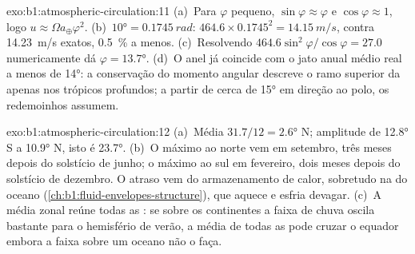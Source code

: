 \begin{solution}{exo:b1:atmospheric-circulation:11}
(a)~Para $\varphi$ pequeno, $\sin\varphi \approx \varphi$ e $\cos\varphi \approx 1$,
logo $u \approx \Omega a_\oplus\varphi^2$. (b)~$\ang{10} = \qty{0.1745}{rad}$:
$464.6 \times 0.1745^2 = \qty{14.15}{m/s}$, contra \qty{14.23}{m/s} exatos,
\qty{0.5}{\percent} a menos. (c)~Resolvendo $464.6\sin^2\varphi/\cos\varphi = 27.0$
numericamente dá $\varphi = \ang{13.7}$. (d)~O anel já coincide com o jato anual médio real a menos de
\ang{14}: a conservação do momento angular descreve o ramo superior da  apenas nos
trópicos profundos; a partir de cerca de \ang{15} em direção ao polo, os redemoinhos assumem.
\end{solution}

\begin{solution}{exo:b1:atmospheric-circulation:12}
(a)~Média $31.7/12 = \ang{2.6}$ N; amplitude de \ang{12.8} S a \ang{10.9} N, isto é \ang{23.7}.
(b)~O máximo ao norte vem em setembro, três meses depois do solstício de junho; o máximo ao sul em
fevereiro, dois meses depois do solstício de dezembro. O atraso vem do armazenamento de calor, sobretudo
na  do oceano (\cref{ch:b1:fluid-envelopes-structure}), que aquece e esfria devagar.
(c)~A média zonal reúne todas as : se sobre os continentes a faixa de chuva oscila bastante
para o hemisfério de verão, a média de todas as  pode cruzar o equador embora a faixa sobre
um oceano não o faça.
\end{solution}

